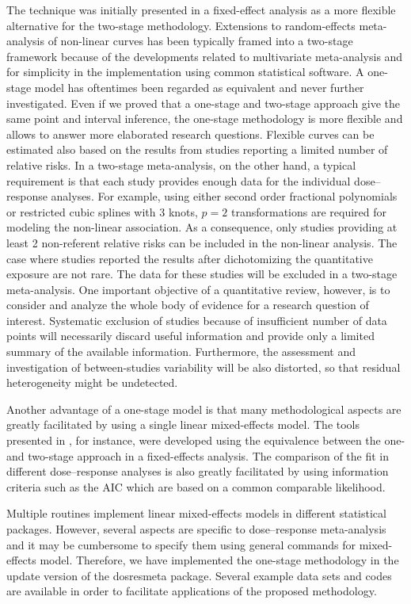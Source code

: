 \documentclass[11pt,a4paper,twoside,openany]{book}\usepackage{knitr}
\newcommand{\pkg}[1]{{\fontseries{b}\selectfont #1}}
\begin{document}
{The technique was initially presented in a fixed-effect analysis as a more flexible alternative for the two-stage methodology. Extensions to random-effects meta-analysis of non-linear curves has been typically framed into a two-stage framework because of the developments related to multivariate meta-analysis and for simplicity in the implementation using common statistical software.  A one-stage model has oftentimes been regarded as equivalent and never further investigated. Even if we proved that a one-stage and two-stage approach give the same point and interval inference, the one-stage methodology is more flexible and allows to answer more elaborated research questions. Flexible curves can be estimated also based on the results from studies reporting a limited number of relative risks. In a two-stage meta-analysis, on the other hand, a typical requirement is that each study provides enough data for the individual dose--response analyses. For example, using either second order fractional polynomials or restricted cubic splines with 3 knots, $p = 2$ transformations are required for modeling the non-linear association. As a consequence, only studies providing at least 2 non-referent relative risks can be included in the non-linear analysis. The case where studies reported the results after dichotomizing the quantitative exposure are not rare. The data for these studies will be excluded in a two-stage meta-analysis. One important objective of a quantitative review, however, is to consider and analyze the whole body of evidence for a research question of interest. Systematic exclusion of studies because of insufficient number of data points will necessarily discard useful information and provide only a limited summary of the available information. Furthermore, the assessment and investigation of between-studies variability will be also distorted, so that residual heterogeneity might be undetected. 

Another advantage of a one-stage model is that many methodological aspects are greatly facilitated by using a single linear mixed-effects model. The tools presented in , for instance, were developed using the equivalence between the one- and two-stage approach in a fixed-effects analysis. The comparison of the fit in different dose--response analyses is also greatly facilitated by using information criteria such as the AIC which are based on a common comparable likelihood.

Multiple routines implement linear mixed-effects models in different statistical packages. However, several aspects are specific to dose--response meta-analysis and it may be cumbersome to specify them using general commands for mixed-effects model. Therefore, we have implemented the one-stage methodology in the update version of the \pkg{dosresmeta} package. Several example data sets and codes are available in order to facilitate applications of the proposed methodology.

}
\end{document}

